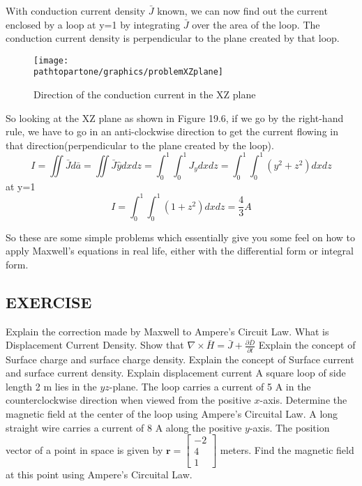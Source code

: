 \begin{exmp}
With conduction current density $\bar{J}$ known, we can now find out the current enclosed by a loop at y=1 by integrating $\bar{J}$ over the area of the loop. The conduction current density is perpendicular to the plane created by that loop.
\begin{figure}[h]
\centering
\texttt{[image: \\pathtopartone/graphics/problemXZplane]}
\caption{Direction of the conduction current in the XZ plane}
\end{figure} 
So looking at the XZ plane as shown in Figure 19.6, if we go by the right-hand rule, we have to go in an anti-clockwise direction to get the current flowing in that direction(perpendicular to the plane created by the loop).
\begin{dmath*}
I=\iint\bar{J}d\bar{a}=\iint\bar{J}\hat{y}dxdz
=\int_{0}^{1}\int_{0}^{1}J_{y}dxdz
=\int_{0}^{1}\int_{0}^{1}(y^{2}+z^{2})dxdz
\end{dmath*}
at y=1
\begin{dmath*}
I=\int_{0}^{1}\int_{0}^{1}(1+z^{2})dxdz
= \frac{4}{3}A
\end{dmath*}
\end{exmp}
So these are some simple problems which essentially give you some feel on how to apply Maxwell's equations in real life, either with the differential form or integral form.


\begin{mdframed}[backgroundcolor=lightblue, linewidth=1pt, hidealllines=true]
\section{EXERCISE}

\begin{ExerciseList}
\Exercise[label={ex11}]Explain the correction made by Maxwell to 		Ampere's Circuit Law.
\Exercise[label={ex12}] What is Displacement Current Density.
\Exercise[label={ex13}] Show that $\nabla\times\bar{H}=\bar{J}+\frac{\partial\bar{D}}{\partial t}$
\Exercise[label={ex14}] Explain the concept of Surface charge and surface charge density.
\Exercise[label={ex15}] Explain the concept of Surface current and surface current density.
\Exercise[label={ex16}] Explain displacement current
\Exercise[label={ex17}] A square loop of side length 2 m lies in the $yz$-plane. The loop carries a current of 5 A in the counterclockwise direction when viewed from the positive $x$-axis. Determine the magnetic field at the center of the loop using Ampere's Circuital Law.
\Exercise[label={ex17}] A long straight wire carries a current of 8 A along the positive $y$-axis. The position vector of a point in space is given by $\mathbf{r} = \begin{bmatrix} -2 \\ 4 \\ 1 \end{bmatrix}$ meters. Find the magnetic field at this point using Ampere's Circuital Law.
\end{ExerciseList}
\end{mdframed}
